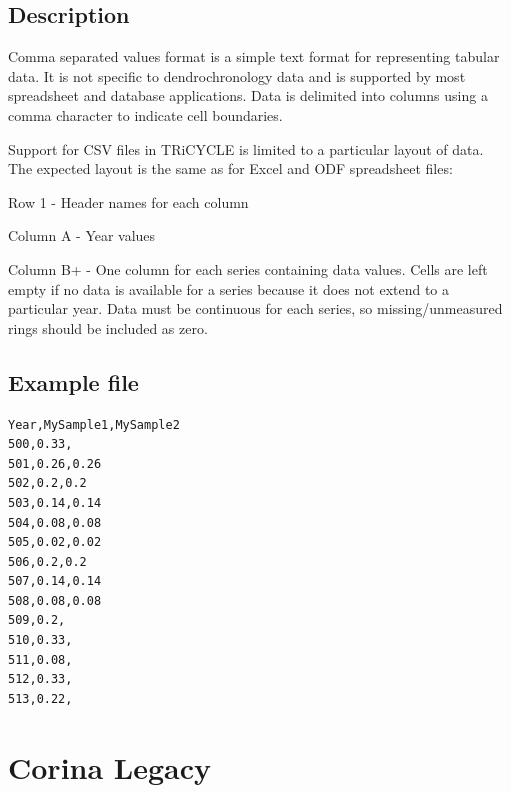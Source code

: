\section{Description}

Comma separated values format is a simple text format for representing tabular data. It is not specific to dendrochronology data and is supported by most spreadsheet and database applications. Data is delimited into columns using a comma character to indicate cell boundaries.

Support for CSV files in TRiCYCLE is limited to a particular layout of data.  The expected layout is the same as for Excel and ODF spreadsheet files:

\begin{itemize*}
 \item Row 1 - Header names for each column
 \item Column A - Year values
 \item Column B+ - One column for each series containing data values. Cells are left empty if no data is available for a series because it does not extend to a particular year. Data must be continuous for each series, so missing/unmeasured rings should be included as zero.
\end{itemize*}

\newpage
\section{Example file}

\begin{lstlisting}
Year,MySample1,MySample2
500,0.33,
501,0.26,0.26
502,0.2,0.2
503,0.14,0.14
504,0.08,0.08
505,0.02,0.02
506,0.2,0.2
507,0.14,0.14
508,0.08,0.08
509,0.2,
510,0.33,
511,0.08,
512,0.33,
513,0.22,
\end{lstlisting}

\chapter{Corina Legacy}

